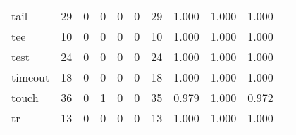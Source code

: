 \begin{longtable}{lp{1.2cm}p{1.2cm}p{1.2cm}p{1.2cm}p{1.2cm}p{1.2cm}p{1.2cm}p{1.2cm}p{1.2cm}p{1.2cm}}
tail      &                                    29 &                                                  0 &                                                  0 &                                                  0 &                                                  0 &                                                 29 &                                         1.000 &                                              1.000 &                                              1.000 \\
tee       &                                    10 &                                                  0 &                                                  0 &                                                  0 &                                                  0 &                                                 10 &                                         1.000 &                                              1.000 &                                              1.000 \\
test      &                                    24 &                                                  0 &                                                  0 &                                                  0 &                                                  0 &                                                 24 &                                         1.000 &                                              1.000 &                                              1.000 \\
timeout   &                                    18 &                                                  0 &                                                  0 &                                                  0 &                                                  0 &                                                 18 &                                         1.000 &                                              1.000 &                                              1.000 \\
touch     &                                    36 &                                                  0 &                                                  1 &                                                  0 &                                                  0 &                                                 35 &                                         0.979 &                                              1.000 &                                              0.972 \\
tr        &                                    13 &                                                  0 &                                                  0 &                                                  0 &                                                  0 &                                                 13 &                                         1.000 &                                              1.000 &                                              1.000 \\

\end{longtable}
